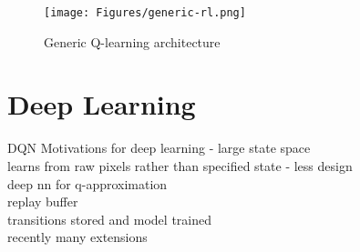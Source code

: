 \begin{figure}
    \centering
    \texttt{[image: Figures/generic-rl.png]}
    \caption{Generic Q-learning architecture\cite{sutton2018reinforcement}} %
    \label{fig:q-learning-generic}
\end{figure}
\section{Deep Learning}
DQN \cite{mnih2015human}
Motivations for deep learning - large state space\\
learns from raw pixels rather than specified state - less design\\
deep nn for q-approximation\\
replay buffer\\
transitions stored and model trained\\
recently many extensions \cite{hessel2018rainbow}
